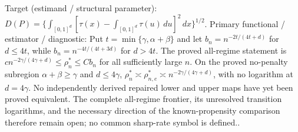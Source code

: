 \documentclass{article}
\begin{document}
Target (estimand / structural parameter): \(D(P)=\{\int_{[0,1]^d}[\tau(x)-\int_{[0,1]^d}\tau(u)\,du]^2\,dx\}^{1/2}\).
Primary functional / estimator / diagnostic: Put \(t=\min\{\gamma,\alpha+\beta\}\) and let \(b_n=n^{-2t/(4t+d)}\) for \(d\leq4t\), while \(b_n=n^{-4t/(4t+3d)}\) for \(d>4t\).  The proved all-regime statement is \(c n^{-2\gamma/(4\gamma+d)}\leq\rho_n^*\leq Cb_n\) for all sufficiently large \(n\).  On the proved no-penalty subregion \(\alpha+\beta\geq\gamma\) and \(d\leq4\gamma\), \(\rho_n^*\asymp\rho_{n,e}^*\asymp n^{-2\gamma/(4\gamma+d)}\), with no logarithm at \(d=4\gamma\).  No independently derived repaired lower and upper maps have yet been proved equivalent.  The complete all-regime frontier, its unresolved transition logarithms, and the necessary direction of the known-propensity comparison therefore remain open; no common sharp-rate symbol is defined..
\end{document}
